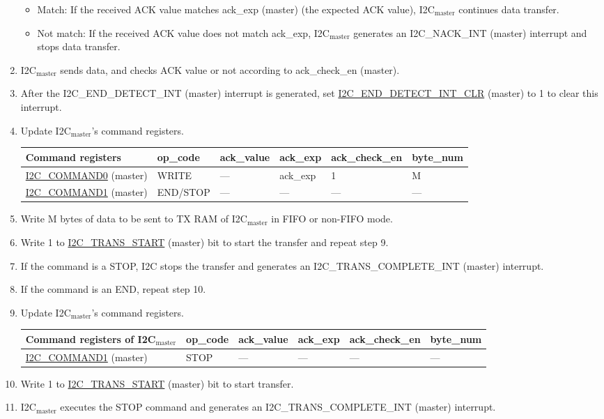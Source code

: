 \documentclass[main\_\_EN.tex]{subfiles}
\begin{document}
\begin{enumerate}
\begin{itemize}
\item Match: If the received ACK value matches ack\_exp (master) (the expected ACK value), I2C$_\text{master}$ continues data transfer.
\item Not match: If the received ACK value does not match ack\_exp, I2C$_\text{master}$ generates an I2C\_NACK\_INT (master) interrupt and stops data transfer.
\end{itemize}
\item I2C$_\text{master}$ sends data, and checks ACK value or not according to ack\_check\_en (master).
\item After the I2C\_END\_DETECT\_INT (master) interrupt is generated, set \hyperref[fielddesc:I2CENDDETECTINTCLR]{I2C\_END\_DETECT\_INT\_CLR} (master) to 1 to clear this interrupt.
\item Update I2C$_\text{master}$'s command registers.
\begin{longtable}{ | p{5cm} | p{1.5cm} | p{1.5cm} | p{1.5cm} |p{2.5cm} | p{1.5cm} |}
\hline\rowcolor{lightgray}
Command registers& op\_code & ack\_value&ack\_exp&ack\_check\_en&byte\_num  \\ \hline
\hyperref[fielddesc:I2CCOMMAND0]{I2C\_COMMAND0} (master)& WRITE& ---&ack\_exp&1&M  \\ \hline
\hyperref[fielddesc:I2CCOMMAND1]{I2C\_COMMAND1} (master)& END/STOP& ---&---&---&---  \\ \hline
\end{longtable}
\item Write M bytes of data to be sent to TX RAM of I2C$_\text{master}$ in FIFO or non-FIFO mode.
\item Write 1 to \hyperref[fielddesc:I2CTRANSSTART]{I2C\_TRANS\_START} (master) bit to start the transfer and repeat step 9.
\item If the command is a STOP, I2C stops the transfer and generates an I2C\_TRANS\_COMPLETE\_INT (master) interrupt.
\item If the command is an END, repeat step 10.
\item Update I2C$_\text{master}$'s command registers.
\begin{longtable}{ | p{5cm} | p{1.5cm} | p{1.5cm} | p{1.5cm} |p{2.5cm} | p{1.5cm} |}
\hline\rowcolor{lightgray}
Command registers of I2C$_\text{master}$& op\_code & ack\_value&ack\_exp&ack\_check\_en&byte\_num  \\ \hline
\hyperref[fielddesc:I2CCOMMAND1]{I2C\_COMMAND1} (master)& STOP& ---&---&---&---  \\ \hline
\end{longtable}
\item Write 1 to \hyperref[fielddesc:I2CTRANSSTART]{I2C\_TRANS\_START} (master) bit to start transfer.
\item I2C$_\text{master}$ executes the STOP command and generates an I2C\_TRANS\_COMPLETE\_INT (master) interrupt.
\end{enumerate}
\end{document}
